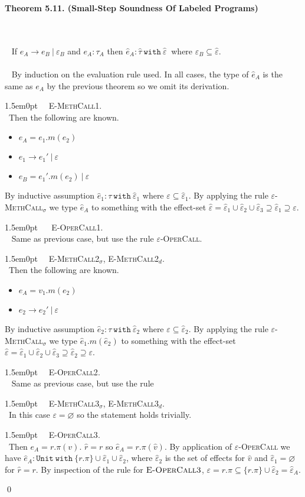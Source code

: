\documentclass{llncs}
\newcommand{\keywadj}[1]{\mathtt{#1}}
\newcommand{\keyw}[1]{\keywadj{#1}~}
\newcommand{\thm}[3]{
	\begin{large}
		\bf{#1}
	\end{large} \\\\
	\fbox{Statement.} ~ #2
	\fbox{Proof.}~ #3 \qed
}
\newcommand{\proofcase}[2]{
	\begin{adjustwidth}{1.5em}{0pt}
		\fbox{Case.}~~#1. \\ ~#2
	\end{adjustwidth}
}
\begin{document}
\thm{Theorem 5.11. (Small-Step Soundness Of Labeled Programs)}
{If $e_A \longrightarrow e_B~|~\varepsilon_B$ and $e_A : \tau_A$ then $\hat e_A : \hat \tau~\keyw{with ~\hat \varepsilon}$ where $\varepsilon_B \subseteq \hat \varepsilon$.\\\\}
{By induction on the evaluation rule used. In all cases, the type of $\hat e_A$ is the same as $e_A$ by the previous theorem so we omit its derivation.

\proofcase{\textsc{E-MethCall1}}
{Then the following are known.
\begin{itemize}
	\item $e_A = e_1.m(e_2)$
	\item $e_1 \rightarrow e_1'~|~\varepsilon$
	\item $e_B = e_1'.m(e_2)~|~\varepsilon$
\end{itemize}
By inductive assumption $\hat e_1 : \tau~ \keyw{with} \hat \varepsilon_1$ where $\varepsilon \subseteq \hat \varepsilon_1$. By applying the rule \textsc{$\varepsilon$-MethCall$_\sigma$} we type $\hat e_A$ to something with the effect-set $\hat \varepsilon = \hat \varepsilon_1 \cup \hat \varepsilon_2 \cup \hat \varepsilon_3 \supseteq \hat \varepsilon_1 \supseteq \varepsilon$.
}

\proofcase{ \textsc{E-OperCall1}}
{
	Same as previous case, but use the rule \textsc{$\varepsilon$-OperCall}.
}

\proofcase{\textsc{E-MethCall2$_\sigma$}, \textsc{E-MethCall2$_d$}}
{Then the following are known.
\begin{itemize}
	\item $e_A = v_1.m(e_2)$
	\item $e_2 \longrightarrow e_2'~|~\varepsilon$
\end{itemize}
By inductive assumption $\hat e_2 : \tau~ \keyw{with} \hat \varepsilon_2$ where $\varepsilon \subseteq \hat \varepsilon_2$. By applying the rule \textsc{$\varepsilon$-MethCall$_\sigma$} we type $\hat e_1.m(\hat e_2)$ to something with the effect-set $\hat \varepsilon = \hat \varepsilon_1 \cup \hat \varepsilon_2 \cup \hat \varepsilon_3 \supseteq \hat \varepsilon_2 \supseteq \varepsilon$.
}

\proofcase{\textsc{E-OperCall2}} {
	Same as previous case, but use the rule
}

\proofcase{\textsc{E-MethCall3$_\sigma$}, \textsc{E-MethCall3$_d$}}
{In this case $\varepsilon = \varnothing$ so the statement holds trivially.
}

\proofcase{\textsc{E-OperCall3}}
{Then $e_A = r.\pi(v)$. $\hat r = r$ so $\hat e_A = r.\pi(\hat v)$. By application of \textsc{$\varepsilon$-OperCall} we have $\hat e_A : \keyw{Unit~with} \{ r.\pi \} \cup \hat \varepsilon_1 \cup \hat \varepsilon_2$, where $\hat \varepsilon_2$ is the set of effects for $\hat v$ and $\hat \varepsilon_1 = \varnothing$ for $\hat r = r$. By inspection of the rule for $\textsc{E-OperCall3}$, $\varepsilon = r.\pi \subseteq \{ r.\pi \} \cup \hat \varepsilon_2 = \hat \varepsilon_A$.
}
}
\end{document}
